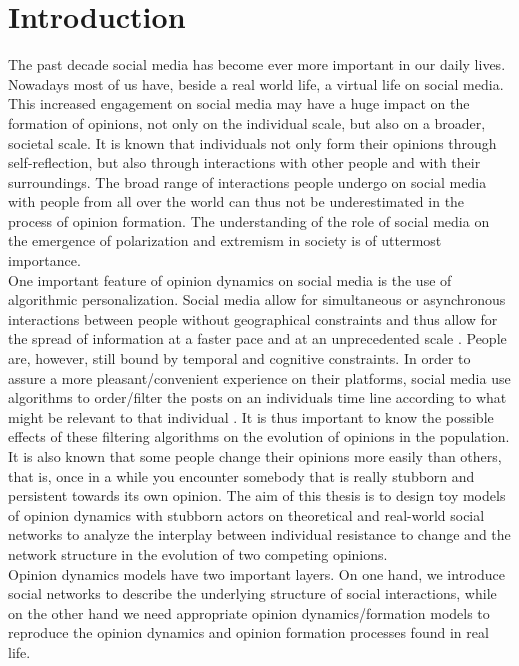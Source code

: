 \documentclass[11 pt , letterpaper , twoside , openright]{book}
\begin{document}
\chapter{Introduction}


The past decade social media has become ever more important in our daily lives. Nowadays most of us have, beside a real world life, a virtual life on social media. This increased engagement on social media may have a huge impact on the formation of opinions, not only on the individual scale, but also on a broader, societal scale. It is known that individuals not only form their opinions through self-reflection, but also through interactions with other people and with their surroundings. The broad range of interactions people undergo on social media with people from all over the world can thus not be underestimated in the process of opinion formation. The understanding of the role of social media on the emergence of polarization and extremism in society is of uttermost importance.\\
One important feature of opinion dynamics on social media is the use of algorithmic personalization. Social media allow for simultaneous or asynchronous interactions between people without geographical constraints and thus allow for the spread of information at a faster pace and at an unprecedented scale \cite{Perra2019}. People are, however, still bound by temporal and cognitive constraints. In order to assure a more pleasant/convenient experience on their platforms, social media use algorithms to order/filter the posts on an individuals time line according to what might be relevant to that individual \cite{Perra2019}. It is thus important to know the possible effects of these filtering algorithms on the evolution of opinions in the population.\\  
It is also known that some people change their opinions more easily than others, that is, once in a while you encounter somebody that is really stubborn and persistent towards its own opinion. The aim of this thesis is to design toy models of opinion dynamics with stubborn actors on theoretical and real-world social networks to analyze the interplay between individual resistance to change and the network structure in the evolution of two competing opinions.\\
Opinion dynamics models have two important layers. On one hand, we introduce social networks to describe the underlying structure of social interactions, while on the other hand we need appropriate opinion dynamics/formation models to reproduce the opinion dynamics and opinion formation processes found in real life. 
\end{document}
